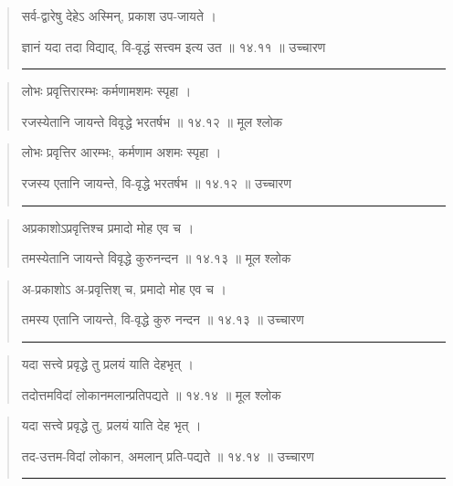 \begin{quotation}

सर्व-द्वारेषु देहेऽ अस्मिन्, प्रकाश उप-जायते  ।  

ज्ञानं यदा तदा विद्याद्, वि-वृद्धं सत्त्वम इत्य उत  ॥ १४.११ ॥  उच्चारण

\noindent\rule{16cm}{0.4pt} 
\end{quotation}


\begin{quotation}
लोभः प्रवृत्तिरारम्भः कर्मणामशमः स्पृहा  ।  

रजस्येतानि जायन्ते विवृद्धे भरतर्षभ  ॥ १४.१२ ॥  मूल श्लोक
\end{quotation}

\begin{quotation}

लोभः प्रवृत्तिर आरम्भः, कर्मणाम अशमः स्पृहा  ।  

रजस्य एतानि जायन्ते, वि-वृद्धे भरतर्षभ  ॥ १४.१२ ॥  उच्चारण

\noindent\rule{16cm}{0.4pt} 
\end{quotation}


\begin{quotation}

अप्रकाशोऽप्रवृत्तिश्च प्रमादो मोह एव च  ।  

तमस्येतानि जायन्ते विवृद्धे कुरुनन्दन  ॥ १४.१३ ॥  मूल श्लोक
\end{quotation}

\begin{quotation}

अ-प्रकाशोऽ अ-प्रवृत्तिश् च, प्रमादो मोह एव च  ।  

तमस्य एतानि जायन्ते, वि-वृद्धे कुरु नन्दन  ॥ १४.१३ ॥  उच्चारण

\noindent\rule{16cm}{0.4pt} 
\end{quotation}


\begin{quotation}

यदा सत्त्वे प्रवृद्धे तु प्रलयं याति देहभृत्‌  ।  

तदोत्तमविदां लोकानमलान्प्रतिपद्यते  ॥ १४.१४ ॥  मूल श्लोक
\end{quotation}

\begin{quotation}

यदा सत्त्वे प्रवृद्धे तु, प्रलयं याति देह भृत्‌  ।  

तद-उत्तम-विदां लोकान, अमलान् प्रति-पद्यते  ॥ १४.१४ ॥  उच्चारण

\noindent\rule{16cm}{0.4pt} 
\end{quotation}


